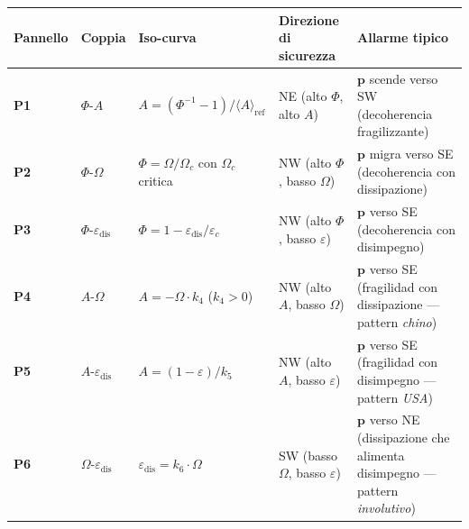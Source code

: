 {\def\LTcaptype{none} %
{\small\begin{longtable}[]{@{}
  >{\raggedright\arraybackslash}p{}
  >{\raggedright\arraybackslash}p{}
  >{\raggedright\arraybackslash}p{}
  >{\raggedright\arraybackslash}p{}
  >{\raggedright\arraybackslash}p{}@{}}
\toprule\noalign{}
\begin{minipage}[b]{\linewidth}\raggedright
Pannello
\end{minipage} & \begin{minipage}[b]{\linewidth}\raggedright
Coppia
\end{minipage} & \begin{minipage}[b]{\linewidth}\raggedright
Iso-curva
\end{minipage} & \begin{minipage}[b]{\linewidth}\raggedright
Direzione di sicurezza
\end{minipage} & \begin{minipage}[b]{\linewidth}\raggedright
Allarme tipico
\end{minipage} \\
\midrule\noalign{}
\endhead
\bottomrule\noalign{}
\endlastfoot
\textbf{P1} & \(\Phi\)-\(A\) &
\(A = (\Phi^{-1} - 1)/\langle A\rangle_{\text{ref}}\) & NE (alto
\(\Phi\), alto \(A\)) & \(\boldsymbol{p}\) scende verso SW (decoherencia
fragilizzante) \\
\textbf{P2} & \(\Phi\)-\(\Omega\) & \(\Phi = \Omega/\Omega_c\) con
\(\Omega_c\) critica & NW (alto \(\Phi\), basso \(\Omega\)) &
\(\boldsymbol{p}\) migra verso SE (decoherencia con dissipazione) \\
\textbf{P3} & \(\Phi\)-\(\varepsilon_{\text{dis}}\) &
\(\Phi = 1 - \varepsilon_{\text{dis}}/\varepsilon_c\) & NW (alto
\(\Phi\), basso \(\varepsilon\)) & \(\boldsymbol{p}\) verso SE
(decoherencia con disimpegno) \\
\textbf{P4} & \(A\)-\(\Omega\) & \(A = -\Omega \cdot k_4\) (\(k_4 > 0\))
& NW (alto \(A\), basso \(\Omega\)) & \(\boldsymbol{p}\) verso SE
(fragilidad con dissipazione --- pattern \emph{chino}) \\
\textbf{P5} & \(A\)-\(\varepsilon_{\text{dis}}\) &
\(A = (1 - \varepsilon)/k_5\) & NW (alto \(A\), basso \(\varepsilon\)) &
\(\boldsymbol{p}\) verso SE (fragilidad con disimpegno --- pattern
\emph{USA}) \\
\textbf{P6} & \(\Omega\)-\(\varepsilon_{\text{dis}}\) &
\(\varepsilon_{\text{dis}} = k_6 \cdot \Omega\) & SW (basso \(\Omega\),
basso \(\varepsilon\)) & \(\boldsymbol{p}\) verso NE (dissipazione che
alimenta disimpegno --- pattern \emph{involutivo}) \\
\end{longtable}}
}

